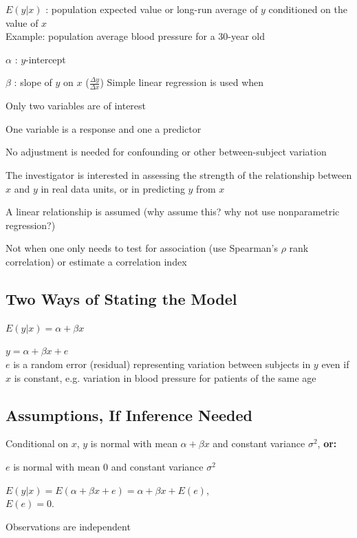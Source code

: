 \item $E(y|x)$ : population expected value or long-run average of $y$
  conditioned on the value of $x$ \\
  Example: population average blood pressure for a 30-year old
\item $\alpha$ : $y$-intercept
\item $\beta$ : slope of $y$ on $x$ ($\frac{\Delta y}{\Delta x}$)
\ei
Simple linear regression is used when
\bi
\item Only two variables are of interest
\item One variable is a response and one a predictor
\item No adjustment is needed for confounding or other between-subject
   variation
\item The investigator is interested in assessing the strength of the
  relationship between $x$ and $y$ in real data units, or in
  predicting $y$ from $x$
\item A linear relationship is assumed (why assume this? why not use
  nonparametric regression?)
\item Not when one only needs to test for association (use Spearman's
  $\rho$ rank correlation) or estimate a correlation index
\ei
\clearpage

\subsection{Two Ways of Stating the Model}
\bi
\item $E(y|x) = \alpha + \beta x$
\item $y = \alpha + \beta x + e$ \\
  $e$ is a random error (residual) representing variation between
  subjects in $y$ even if $x$ is constant, e.g. variation in
  blood pressure for patients of the same age
\ei
\subsection{Assumptions, If Inference Needed}
\bi
\item Conditional on $x$, $y$ is normal with mean $\alpha + \beta x$
  and constant variance $\sigma^2$, \textbf{or:}
\item $e$ is normal with mean 0 and constant variance $\sigma^2$
\item $E(y|x) = E(\alpha + \beta x + e) = \alpha + \beta x + E(e)$, \\
  $E(e) = 0$.
\item Observations are independent
\ei
